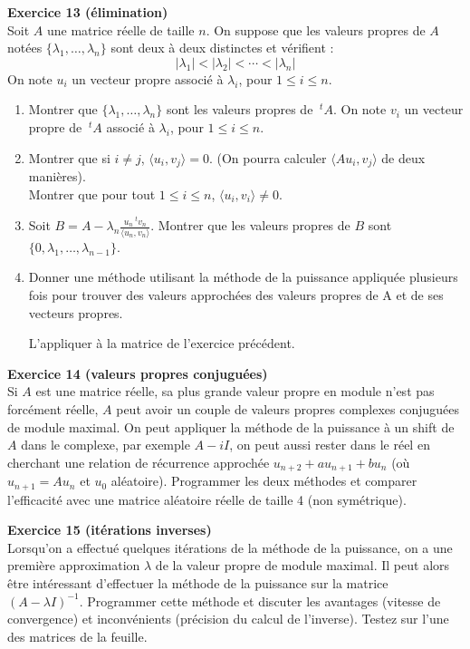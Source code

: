 \documentclass[10pt,a4paper]{article}
\begin{document}
{\bf Exercice 13  (élimination)}\\
Soit $A$ une matrice réelle de taille $n$.
On suppose que les valeurs propres de $A$ notées $\{\lambda_1,\ldots,\lambda_n\}$ sont deux à deux distinctes et vérifient :
\[|\lambda_1|<|\lambda_2|<\cdots <|\lambda_n|\]
On note $u_i$ un vecteur propre associé à $\lambda_i$, pour $1\leq i\leq n$.
\begin{enumerate}
 \item Montrer que $\{\lambda_1,\ldots,\lambda_n\}$ sont les valeurs 
propres de $\ ^tA$.
On note $v_i$ un vecteur propre de $\ ^tA$ associé à $\lambda_i$, pour $1\leq i\leq n$.
\item Montrer que si $i\not= j$, $\langle u_i,v_j\rangle =0$.
(On pourra calculer $\langle Au_i,v_j\rangle$ de deux manières).\\
Montrer que pour tout $1\leq i\leq n$, $\langle u_i,v_i\rangle\not=0$.

\item Soit $B=A-\lambda_n\frac{u_n\ ^tv_n}{\langle u_n,v_n\rangle}$.
Montrer que les valeurs propres de $B$ sont 
$\{0,\lambda_1,\ldots,\lambda_{n-1}\}$.

\item Donner une méthode utilisant la méthode de la puissance appliquée 
plusieurs fois pour trouver des valeurs approchées des valeurs propres 
de A et de ses vecteurs propres.

L'appliquer à la matrice de l'exercice précédent.
\end{enumerate}

{\bf Exercice 14 (valeurs propres conjuguées)}\\
Si $A$ est une matrice réelle, sa plus grande valeur propre en module n'est
pas forcément réelle, $A$ peut avoir un couple de valeurs propres
complexes conjuguées de module maximal. On peut appliquer la
méthode de la puissance à un shift de $A$ dans le complexe, par
exemple $A-iI$, on peut aussi rester dans le réel en cherchant
une relation de récurrence approchée $u_{n+2}+au_{n+1}+bu_n$
(où $u_{n+1}=Au_n$ et $u_0$ aléatoire). Programmer les deux
méthodes et comparer l'efficacité avec une matrice aléatoire
réelle de taille 4 (non symétrique).

{\bf Exercice 15 (itérations inverses)} \\
Lorsqu'on a effectué quelques itérations de la méthode de la puissance,
on a une première approximation $\lambda$ 
de la valeur propre de module maximal.
Il peut alors être intéressant d'effectuer la méthode de la puissance
sur la matrice $(A-\lambda I)^{-1}$. Programmer cette méthode
et discuter les avantages (vitesse de convergence) et inconvénients
(précision du calcul de l'inverse). Testez sur l'une des matrices
de la feuille.
\end{document}
